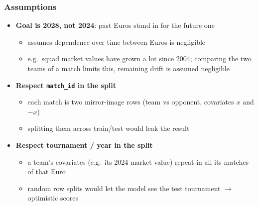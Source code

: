 \documentclass[aspectratio=1610, 9pt]{beamer}
\begin{document}
\begin{frame}
  \frametitle{Assumptions}

  \begin{itemize}
    \item \textbf{Goal is 2028, not 2024}: past Euros stand in for the future one
    \begin{itemize}
      \item assumes dependence over time between Euros is negligible
      \item e.g.\ squad market values have grown a lot since 2004; comparing the two
            teams of a match limits this, remaining drift is assumed negligible
    \end{itemize}

    \item \textbf{Respect \texttt{match\_id} in the split}
    \begin{itemize}
      \item each match is two mirror-image rows (team vs opponent, covariates $x$ and $-x$)
      \item splitting them across train/test would leak the result
    \end{itemize}

    \item \textbf{Respect tournament / year in the split}
    \begin{itemize}
      \item a team's covariates (e.g.\ its 2024 market value) repeat in all its
            matches of that Euro
      \item random row splits would let the model see the test tournament
            $\rightarrow$ optimistic scores
    \end{itemize}
  \end{itemize}

\end{frame}
\end{document}

